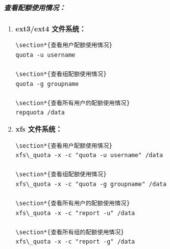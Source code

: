 \documentclass[12pt,UTF8]{ctexbook}
\begin{document}
\subparagraph{查看配额使用情况：}
\begin{enumerate}
    \item \textbf{ext3/ext4 文件系统：}
    \begin{verbatim}
\section*{查看用户配额使用情况}
quota -u username

\section*{查看组配额使用情况}
quota -g groupname

\section*{查看所有用户的配额使用情况}
repquota /data
    \end{verbatim}
    
    \item \textbf{xfs 文件系统：}
    \begin{verbatim}
\section*{查看用户配额使用情况}
xfs\_quota -x -c "quota -u username" /data

\section*{查看组配额使用情况}
xfs\_quota -x -c "quota -g groupname" /data

\section*{查看所有用户的配额使用情况}
xfs\_quota -x -c "report -u" /data

\section*{查看所有组的配额使用情况}
xfs\_quota -x -c "report -g" /data
    \end{verbatim}
\end{enumerate}
\end{document}
